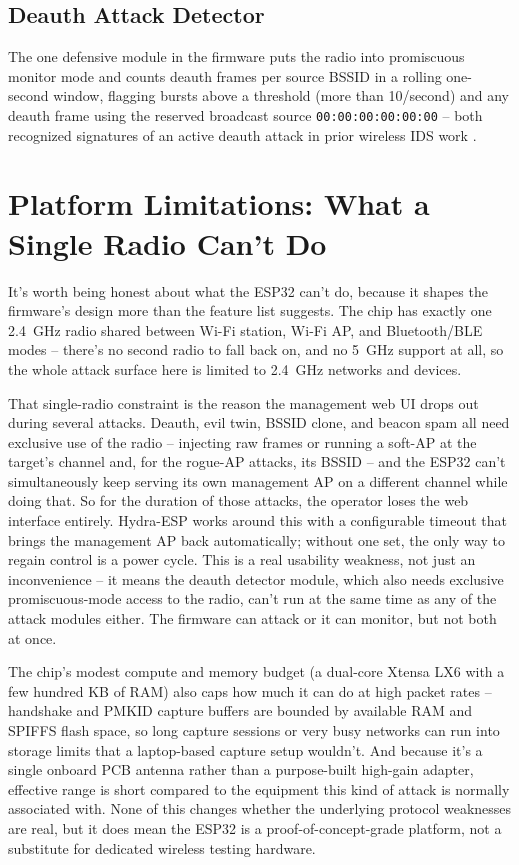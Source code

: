 \documentclass[conference]{IEEEtran}
\begin{document}
\subsection{Deauth Attack Detector}
The one defensive module in the firmware puts the radio into promiscuous monitor mode and counts deauth frames per source BSSID in a rolling one-second window, flagging bursts above a threshold (more than 10/second) and any deauth frame using the reserved broadcast source \texttt{00:00:00:00:00:00} -- both recognized signatures of an active deauth attack in prior wireless IDS work \cite{wids}.

\section{Platform Limitations: What a Single Radio Can't Do}

It's worth being honest about what the ESP32 can't do, because it shapes the firmware's design more than the feature list suggests. The chip has exactly one 2.4~GHz radio shared between Wi-Fi station, Wi-Fi AP, and Bluetooth/BLE modes -- there's no second radio to fall back on, and no 5~GHz support at all, so the whole attack surface here is limited to 2.4~GHz networks and devices.

That single-radio constraint is the reason the management web UI drops out during several attacks. Deauth, evil twin, BSSID clone, and beacon spam all need exclusive use of the radio -- injecting raw frames or running a soft-AP at the target's channel and, for the rogue-AP attacks, its BSSID -- and the ESP32 can't simultaneously keep serving its own management AP on a different channel while doing that. So for the duration of those attacks, the operator loses the web interface entirely. Hydra-ESP works around this with a configurable timeout that brings the management AP back automatically; without one set, the only way to regain control is a power cycle. This is a real usability weakness, not just an inconvenience -- it means the deauth detector module, which also needs exclusive promiscuous-mode access to the radio, can't run at the same time as any of the attack modules either. The firmware can attack or it can monitor, but not both at once.

The chip's modest compute and memory budget (a dual-core Xtensa LX6 with a few hundred KB of RAM) also caps how much it can do at high packet rates -- handshake and PMKID capture buffers are bounded by available RAM and SPIFFS flash space, so long capture sessions or very busy networks can run into storage limits that a laptop-based capture setup wouldn't. And because it's a single onboard PCB antenna rather than a purpose-built high-gain adapter, effective range is short compared to the equipment this kind of attack is normally associated with. None of this changes whether the underlying protocol weaknesses are real, but it does mean the ESP32 is a proof-of-concept-grade platform, not a substitute for dedicated wireless testing hardware.
\end{document}
